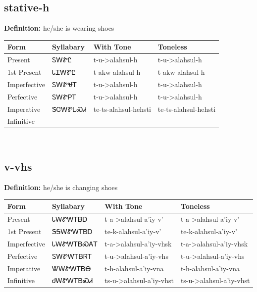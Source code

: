 \documentclass{article}%
\begin{document}
\subsection*{stative-h}%
\textbf{Definition: }%
he/she is wearing shoes%
\\[0.5em]%
\begin{tabular}{|l|l|l|l|}%
\hline%
\textbf{Form}&\textbf{Syllabary}&\textbf{With Tone}&\textbf{Toneless}\\%
\hline%
Present&ᏚᎳᏑᏝ&t{-}u{-}>alahsul{-}h&t{-}u{-}>alahsul{-}h\\%
1st Present&ᏓᏆᎳᏑᏝ&t{-}akw{-}alahsul{-}h&t{-}akw{-}alahsul{-}h\\%
Imperfective&ᏚᎳᏑᏠᎢ&t{-}u{-}>alahsul{-}h&t{-}u{-}>alahsul{-}h\\%
Perfective&ᏚᎳᏑᏢᎢ&t{-}u{-}>alahsul{-}h&t{-}u{-}>alahsul{-}h\\%
Imperative&ᏕᏣᎳᏑᏞᏍᏗ&te{-}ts{-}alahsul{-}hehsti&te{-}ts{-}alahsul{-}hehsti\\%
Infinitive&&&\\%
\hline%
\end{tabular}%
\\[1em]%
\subsection*{v-vhs}%
\textbf{Definition: }%
he/she is changing shoes%
\\[0.5em]%
\begin{tabular}{|l|l|l|l|}%
\hline%
\textbf{Form}&\textbf{Syllabary}&\textbf{With Tone}&\textbf{Toneless}\\%
\hline%
Present&ᏓᎳᏑᎳᎢᏴᎠ&t{-}a{-}>alahsul{-}a'iy{-}v'&t{-}a{-}>alahsul{-}a'iy{-}v'\\%
1st Present&ᏕᎦᎳᏑᎳᎢᏴᎠ&te{-}k{-}alahsul{-}a'iy{-}v'&te{-}k{-}alahsul{-}a'iy{-}v'\\%
Imperfective&ᏓᎳᏑᎳᎢᏴᏍᎪᎢ&t{-}a{-}>alahsul{-}a'iy{-}vhsk&t{-}a{-}>alahsul{-}a'iy{-}vhsk\\%
Perfective&ᏚᎳᏑᎳᎢᏴᏒᎢ&t{-}u{-}>alahsul{-}a'iy{-}vhs&t{-}u{-}>alahsul{-}a'iy{-}vhs\\%
Imperative&ᏔᎳᏑᎳᎢᏴᎾ&t{-}h{-}alahsul{-}a'iy{-}vna&t{-}h{-}alahsul{-}a'iy{-}vna\\%
Infinitive&ᏧᎳᏑᎳᎢᏴᏍᏗ&ts{-}u{-}>alahsul{-}a'iy{-}vhst&ts{-}u{-}>alahsul{-}a'iy{-}vhst\\%
\hline%
\end{tabular}%
\\[1em]%
\end{document}
